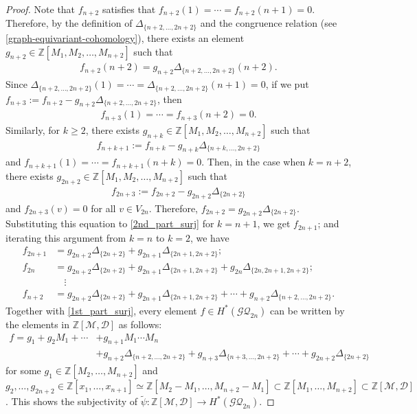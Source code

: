 \documentclass[12pt]{amsart}
\theoremstyle{remark}
\numberwithin{equation}{section}
\begin{document}
\begin{proof}
Note that $f_{n+2}$ satisfies that $f_{n+2}(1)=\cdots=f_{n+2}(n+1)=0$.
Therefore, by the definition of $\Delta_{\{n+2,\ldots, 2n+2\}}$ and the congruence relation (see \eqref{graph-equivariant-cohomology}), there exists an element $g_{n+2}\in \mathbb{Z}[M_{1},M_{2},\ldots, M_{n+2}]$ such that  
\begin{align*}
f_{n+2}(n+2)=g_{n+2}\Delta_{\{n+2,\ldots, 2n+2\}}(n+2).
\end{align*}
Since $\Delta_{\{n+2,\ldots, 2n+2\}}(1)=\cdots =\Delta_{\{n+2,\ldots, 2n+2\}}(n+1)=0$, if we put $f_{n+3}:=f_{n+2}-g_{n+2}\Delta_{\{n+2,\ldots, 2n+2\}}$, then 
\begin{align*}
f_{n+3}(1)=\cdots =f_{n+3}(n+2)=0.
\end{align*}
Similarly, for $k\ge 2$, 
there exists $g_{n+k}\in \mathbb{Z}[M_{1},M_{2},\ldots, M_{n+2}]$ such that 
\begin{align}
\label{2nd_part_surj}
f_{n+k+1}:=f_{n+k}-g_{n+k}\Delta_{\{n+k,\ldots, 2n+2\}} 
\end{align}
and 
$f_{n+k+1}(1)=\cdots =f_{n+k+1}(n+k)=0$. 
Then, in the case when $k=n+2$, 
there exists $g_{2n+2}\in \mathbb{Z}[M_{1},M_{2},\ldots, M_{n+2}]$ such that 
\begin{align*}
f_{2n+3}:=f_{2n+2}-g_{2n+2}\Delta_{\{2n+2\}} 
\end{align*}
and $f_{2n+3}(v)=0$ for all $v\in V_{2n}$.
Therefore, $f_{2n+2}=g_{2n+2}\Delta_{\{2n+2\}}$. 
Substituting this equation to \eqref{2nd_part_surj} for $k=n+1$, we get $f_{2n+1}$; and iterating this argument from $k=n$ to $k=2$, 
we have 
\begin{align*}
f_{2n+1}&=g_{2n+2}\Delta_{\{2n+2\}}+g_{2n+1}\Delta_{\{2n+1, 2n+2\}}; \\ 
f_{2n}&=g_{2n+2}\Delta_{\{2n+2\}}+g_{2n+1}\Delta_{\{2n+1, 2n+2\}}+g_{2n}\Delta_{\{2n,2n+1, 2n+2\}}; \\
&\quad \vdots \\
f_{n+2}&=g_{2n+2}\Delta_{\{2n+2\}}+g_{2n+1}\Delta_{\{2n+1, 2n+2\}}+\cdots + g_{n+2}\Delta_{\{n+2,\ldots, 2n+2\}}.
\end{align*} 
Together with \eqref{1st_part_surj}, every element  
$f\in H^{*}(\mathcal{GQ}_{2n})$ can be written by the elements in $\mathbb{Z}[\mathcal{M},\mathcal{D}]$ as follows:
\begin{align}
\label{linear-relation}
f=g_{1}+g_{2}M_{1}+\cdots &+g_{n+1}M_{1}\cdots M_{n} \\
&+g_{n+2}\Delta_{\{n+2,\ldots, 2n+2\}}+g_{n+3}\Delta_{\{n+3,\ldots, 2n+2\}}+\cdots 
+g_{2n+2}\Delta_{\{2n+2\}} \nonumber
\end{align}
for some 
$g_{1}\in \mathbb{Z}[M_{2},\ldots, M_{n+2}]$ and 
$g_{2},\ldots, g_{2n+2}\in \mathbb{Z}[x_{1},\ldots, x_{n+1}]\simeq \mathbb{Z}[M_{2}-M_{1},\ldots, M_{n+2}-M_{1}]\subset \mathbb{Z}[M_{1},\ldots, M_{n+2}]\subset \mathbb{Z}[\mathcal{M},\mathcal{D}]$.
This shows the subjectivity of $\widetilde{\psi}:\mathbb{Z}[\mathcal{M},\mathcal{D}]\to H^{*}(\mathcal{GQ}_{2n})$.
\end{proof}
\end{document}
